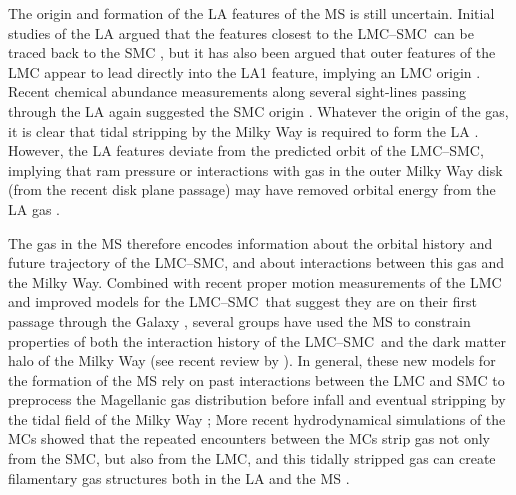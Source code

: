 \documentclass[twocolumn]{aastex62}
\newcommand{\lmcsmc}{LMC--SMC}
\begin{document}
The origin and formation of the LA features of the MS is still uncertain.
Initial studies of the LA argued that the features closest to the \lmcsmc\ can be traced back to the SMC \citep{Putman:1998}, but it has also been argued that outer features of the LMC appear to lead directly into the LA1 feature, implying an LMC origin \citep{Nidever:2008}.
Recent chemical abundance measurements along several sight-lines passing through the LA again suggested the SMC origin \citep{Fox:2018, Richter:2018}.
Whatever the origin of the gas, it is clear that tidal stripping by the Milky Way is required to form the LA \citep{Nidever:2008, Besla:2012}.
However, the LA features deviate from the predicted orbit of the \lmcsmc, implying that ram pressure or interactions with gas in the outer Milky Way disk (from the recent disk plane passage) may have removed orbital energy from the LA gas \citep[e.g.,][]{Bekki:2008}.

The gas in the MS therefore encodes information about the orbital history and future trajectory of the \lmcsmc, and about interactions between this gas and the Milky Way.
Combined with recent proper motion measurements of the LMC \citep{Kallivayalil:2006} and improved models for the \lmcsmc\ that suggest they are on their first passage through the Galaxy \citep{Besla:2007, Besla:2010, Besla:2012}, several groups have used the MS to constrain properties of both the interaction history of the \lmcsmc\ and the dark matter halo of the Milky Way (see recent review by \citealt{DOnghia:2016}).
In general, these new models for the formation of the MS rely on past interactions between the LMC and SMC to preprocess the Magellanic gas distribution before infall and eventual stripping by the tidal field of the Milky Way \citep{Besla:2012, Diaz:2012};
More recent hydrodynamical simulations of the MCs showed that the repeated encounters between the MCs strip gas not only from the SMC, but also from the LMC, and this tidally stripped gas can create filamentary gas structures both in the LA and the MS \citep{Pardy:2018}.
\end{document}
